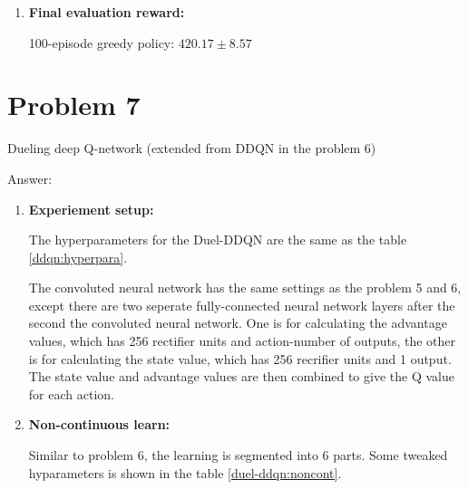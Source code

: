 \documentclass[12pt]{article}
\begin{document}
\begin{tcolorbox}
\begin{center}
\begin{enumerate}
\item {\bf Final evaluation reward:}

100-episode greedy policy: $420.17 \pm 8.57$

	\end{enumerate}
	\end{center}	
\end{tcolorbox}
\section*{Problem 7}
Dueling deep Q-network (extended from DDQN in the problem 6)
\begin{tcolorbox}	
	Answer:	
	\begin{center}
	\begin{enumerate}
	\item
	{\bf Experiement setup:} 
	
	The hyperparameters for the Duel-DDQN are the same as the table \ref{ddqn:hyperpara}.

The convoluted neural network has the same settings as the problem 5 and 6, except there are two seperate fully-connected neural network layers after the second the convoluted neural network. One is for calculating the advantage values, which has 256 rectifier units and action-number of outputs, the other is for calculating the state value, which has 256 recrifier units and 1 output. The state value and advantage values are then combined to give the Q value for each action.  
\item 
{\bf Non-continuous learn:}

Similar to problem 6, the learning is segmented into 6 parts. Some tweaked hyparameters is shown in the table \ref{duel-ddqn:noncont}. 


\end{enumerate}
\end{center}
\end{tcolorbox}
\end{document}
